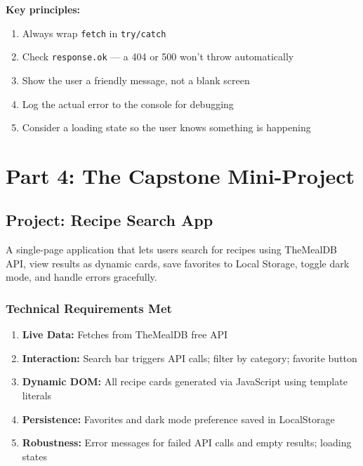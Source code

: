 \documentclass[12pt]{article}
\begin{document}
\textbf{Key principles:}
\begin{enumerate}[noitemsep]
    \item Always wrap \texttt{fetch} in \texttt{try/catch}
    \item Check \texttt{response.ok} --- a 404 or 500 won't throw automatically
    \item Show the user a friendly message, not a blank screen
    \item Log the actual error to the console for debugging
    \item Consider a loading state so the user knows something is happening
\end{enumerate}

\newpage

\section{Part 4: The Capstone Mini-Project}

\subsection{Project: Recipe Search App}

A single-page application that lets users search for recipes using TheMealDB API, view results as dynamic cards, save favorites to Local Storage, toggle dark mode, and handle errors gracefully.

\subsubsection*{Technical Requirements Met}

\begin{enumerate}[noitemsep]
    \item \textbf{Live Data:} Fetches from TheMealDB free API
    \item \textbf{Interaction:} Search bar triggers API calls; filter by category; favorite button
    \item \textbf{Dynamic DOM:} All recipe cards generated via JavaScript using template literals
    \item \textbf{Persistence:} Favorites and dark mode preference saved in LocalStorage
    \item \textbf{Robustness:} Error messages for failed API calls and empty results; loading states
\end{enumerate}
\end{document}
